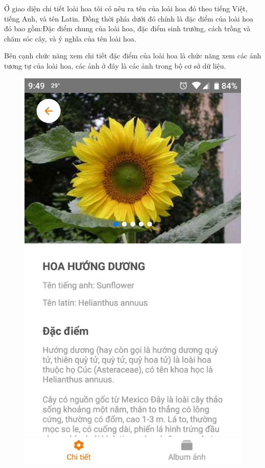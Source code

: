 \documentclass[12pt]{report}
\begin{document}
		\newpage
		Ở giao diện chi tiết loài hoa tôi có nêu ra tên của loài hoa đó theo tiếng Việt, tiếng Anh, và tên Latin. Đồng thời phía dưới đó chính là đặc điểm của loài hoa đó bao gồm:Đặc điểm chung của loài hoa, đặc điểm sinh trưởng, cách trồng và chăm sóc cây, và ý nghĩa của tên loài hoa.

		Bên cạnh chức năng xem chi tiết đặc điểm của loài hoa là chức năng xem các ảnh tương tự của loài hoa, các ảnh ở đây là các ảnh trong bộ cơ sở dữ liệu.
		\begin{figure}[h]
			\centering
			\includegraphics[scale=0.18]{app_detail1}

\end{figure}
\end{document}
